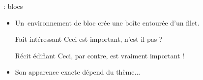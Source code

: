 \documentclass{beamer}
\begin{document}
\begin{frame}[fragile]{\insertsection: blocs}
\begin{itemize}
\item \mbox{Un environnement} de bloc  crée une boîte entourée d'un filet.
\begin{exampletwouptiny}
\begin{block}{Fait intéressant}
Ceci est important, n'est-il pas ?
\end{block}

\begin{alertblock}{Récit édifiant}
Ceci, par contre, est vraiment
important !
\end{alertblock}
\end{exampletwouptiny}

\item Son apparence exacte dépend du thème...
\end{itemize}
\end{frame}
\end{document}
